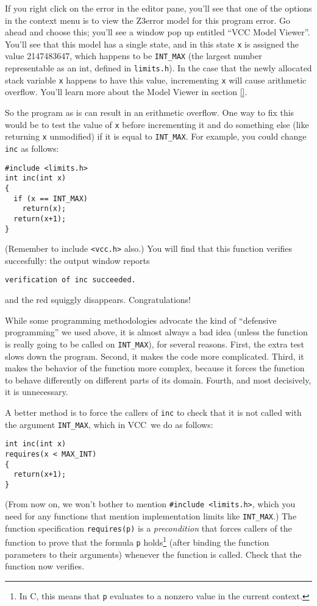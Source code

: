 \documentclass{report}
\newcommand{\Q}[1]{\lstinline~#1~}
\newcommand{\VCC}{VCC}
\newcommand{\Z}{Z3}
\newcommand{\Def}[1]{\emph{#1}}
\newcommand{\Ref}[1]{section \ref{#1}}
\begin{document}
If you right click on the error in the editor pane, you'll see that
one of the options in the context menu is to view the \Z error model
for this program error. Go ahead and choose this; you'll see a window
pop up entitled ``VCC Model Viewer''. You'll see that this model has a
single state, and in this state \Q{x} is assigned the value
2147483647, which happens to be \Q{INT_MAX} (the largest number
representable as an int, defined in \Q{limits.h}). In the case that
the newly allocated stack variable \Q{x} happens to have this value,
incrementing \Q{x} will cause arithmetic overflow. You'll learn more
about the Model Viewer in \Ref{}.

So the program as is can result in an erithmetic overflow. One way to
fix this would be to test the value of \Q{x} before incrementing it
and do something else (like returning \Q{x} unmodified) if it is equal
to \Q{INT_MAX}. For example, you could change \Q{inc} as follows:
\begin{lstlisting}
#include <limits.h>
int inc(int x)
{
  if (x == INT_MAX)
    return(x);
  return(x+1);
}
\end{lstlisting}
(Remember to include \Q{<vcc.h>} also.) You will find that this
function verifies succesfully: the output window reports
\begin{lstlisting}
verification of inc succeeded.
\end{lstlisting}
and the red squiggly disappears. Congratulations!

While some programming methodologies advocate the kind of ``defensive
programming'' we used above, it is almost always a bad idea (unless
the function is really going to be called on \Q{INT_MAX}), for several
reasons.  First, the extra test slows down the program.  Second, it
makes the code more complicated.  Third, it makes the behavior of the
function more complex, because it forces the function to behave
differently on different parts of its domain.  Fourth, and most
decisively, it is unnecessary.

A better method is to force the callers of \Q{inc}
to check that it is not called with the argument \Q{INT_MAX}, which in
\VCC\ we do as follows:
\begin{lstlisting}
int inc(int x)
requires(x < MAX_INT)
{
  return(x+1);
}
\end{lstlisting}
(From now on, we won't bother to mention \Q{#include <limits.h>},
which you need for any functions that mention implementation limits
like \Q{INT_MAX}.)  The function specification \Q{requires(p)} is a
\Def{precondition} that forces callers of the function to prove that
the formula \Q{p} holds\footnote{In C, this means that \Q{p} evaluates
  to a nonzero value in the current context.}  (after binding the
function parameters to their arguments) whenever the function is
called.  Check that the function now verifies.
\end{document}
